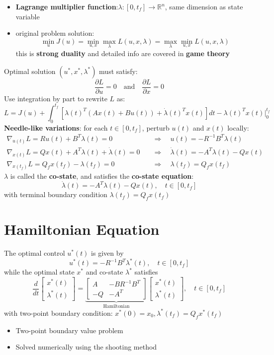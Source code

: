 \documentclass[10pt,a4paper,oneside]{article}
\begin{document}
\begin{itemize}
\item \textbf{Lagrange multiplier function}:$\lambda:[0,t_f]\rightarrow\mathbb{R}^n$, same dimension as state variable
\item original problem solution:
\[
\min _{u} J(u)=\min _{u, x} \max _{\lambda} L(u, x, \lambda)=\max _{\lambda} \min _{u, x} L(u, x, \lambda)
\]
this is \textbf{strong duality} and detailed info are covered in \textbf{game theory}
\end{itemize}
Optimal solution $(u^*,x^*,\lambda^*)$ must satisfy:
\[
\frac{\partial L}{\partial u}=0 \quad \text{and} \quad \frac{\partial L}{\partial x}=0
\]
Use integration by part to rewrite $L$ as:
$$
L=J(u)+\int_{0}^{t_{f}}\left[\lambda(t)^{T}(A x(t)+B u(t))+\dot{\lambda}(t)^{T} x(t)\right] d t-\lambda(t)^{T} x\left.(t)\right|_{0} ^{t_{f}}
$$
\textbf{Needle-like variations}: for each $t\in[0,t_f]$, perturb $u(t)$ and $x(t)$ locally:
\begin{align*}
\nabla_{u(t)} L=R u(t)+B^{T} \lambda(t)=0 &  \quad\Rightarrow \quad u(t)=-R^{-1} B^{T} \lambda(t) \\
\nabla_{x(t)} L=Q x(t)+A^{T} \lambda(t)+\dot{\lambda}(t)=0 &  \quad\Rightarrow \quad \dot{\lambda}(t)=-A^{T} \lambda(t)-Q x(t) \\ 
\nabla_{x\left(t_{f}\right)} L=Q_{f} x\left(t_{f}\right)-\lambda\left(t_{f}\right)=0 &  \quad\Rightarrow \quad \lambda\left(t_{f}\right)=Q_{f} x\left(t_{f}\right) 
\end{align*}
$\lambda$ is called the \textbf{co-state}, and satisfies the \textbf{co-state equation}:
\[
\dot{\lambda}(t)=-A^{T} \lambda(t)-Q x(t), \quad t \in\left[0, t_{f}\right]
\]
with terminal boundary condition $\lambda(t_f)=Q_fx(t_f)$

\section{Hamiltonian Equation}
The optimal control $u^*(t)$ is given by
\[
u^{*}(t)=-R^{-1} B^{T} \lambda^{*}(t), \quad t \in\left[0, t_{f}\right]
\]
while the optimal state $x^*$ and co-state $\lambda^*$ satisfies
\[
\frac{d}{d t}\left[\begin{array}{l}{x^{*}(t)} \\ {\lambda^{*}(t)}\end{array}\right]=\underbrace{\left[\begin{array}{cc}{A} & {-B R^{-1} B^{T}} \\ {-Q} & {-A^{T}}\end{array}\right]}_{\text { Hamiltonian }}\left[\begin{array}{c}{x^{*}(t)} \\ {\lambda^{*}(t)}\end{array}\right], \quad t \in\left[0, t_{f}\right]
\]
with two-point boundary condition: $x^{*}(0)=x_{0}, \lambda^{*}\left(t_{f}\right)=Q_{f} x^{*}\left(t_{f}\right)$
\begin{itemize}
\item Two-point boundary value problem
\item Solved numerically using the shooting method
\end{itemize}
\end{document}
